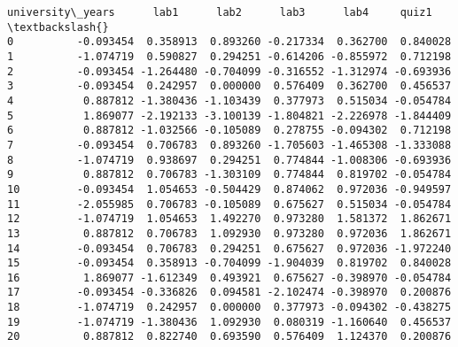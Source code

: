 \documentclass[11pt]{article}
\makeatletter
\newcommand{\boxspacing}{\kern\kvtcb@left@rule\kern\kvtcb@boxsep}
\newcommand{\prompt}[4]{
        {\ttfamily\llap{{\color{#2}[#3]:\hspace{3pt}#4}}\vspace{-\baselineskip}}
    }
\makeatother
\begin{document}
            \begin{tcolorbox}[breakable, size=fbox, boxrule=.5pt, pad at break*=1mm, opacityfill=0]
\prompt{Out}{outcolor}{31}{\boxspacing}
\begin{Verbatim}[commandchars=\\\{\}]
    university\_years      lab1      lab2      lab3      lab4     quiz1  \textbackslash{}
0          -0.093454  0.358913  0.893260 -0.217334  0.362700  0.840028
1          -1.074719  0.590827  0.294251 -0.614206 -0.855972  0.712198
2          -0.093454 -1.264480 -0.704099 -0.316552 -1.312974 -0.693936
3          -0.093454  0.242957  0.000000  0.576409  0.362700  0.456537
4           0.887812 -1.380436 -1.103439  0.377973  0.515034 -0.054784
5           1.869077 -2.192133 -3.100139 -1.804821 -2.226978 -1.844409
6           0.887812 -1.032566 -0.105089  0.278755 -0.094302  0.712198
7          -0.093454  0.706783  0.893260 -1.705603 -1.465308 -1.333088
8          -1.074719  0.938697  0.294251  0.774844 -1.008306 -0.693936
9           0.887812  0.706783 -1.303109  0.774844  0.819702 -0.054784
10         -0.093454  1.054653 -0.504429  0.874062  0.972036 -0.949597
11         -2.055985  0.706783 -0.105089  0.675627  0.515034 -0.054784
12         -1.074719  1.054653  1.492270  0.973280  1.581372  1.862671
13          0.887812  0.706783  1.092930  0.973280  0.972036  1.862671
14         -0.093454  0.706783  0.294251  0.675627  0.972036 -1.972240
15         -0.093454  0.358913 -0.704099 -1.904039  0.819702  0.840028
16          1.869077 -1.612349  0.493921  0.675627 -0.398970 -0.054784
17         -0.093454 -0.336826  0.094581 -2.102474 -0.398970  0.200876
18         -1.074719  0.242957  0.000000  0.377973 -0.094302 -0.438275
19         -1.074719 -1.380436  1.092930  0.080319 -1.160640  0.456537
20          0.887812  0.822740  0.693590  0.576409  1.124370  0.200876


\end{Verbatim}
\end{tcolorbox}
\end{document}

